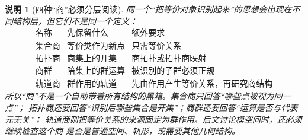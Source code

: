 \documentclass[UTF8,fontset=none,a4paper,11pt]{ctexart}
\theoremstyle{foundation-definition}
\theoremstyle{foundation-theorem}
\theoremstyle{foundation-proposition}
\theoremstyle{foundation-example}
\theoremstyle{foundation-remark}
\newtheorem{remark}[definition]{说明}
\theoremstyle{foundation-theorem}
\begin{document}
\begin{remark}[四种“商”必须分层阅读]\label{rem:quotient-layers}
同一个“把等价对象识别起来”的思想会出现在不同结构层，但它们不是同一个定义：
\[
\begin{array}{c|c|c}
\text{名称}&\text{先保留什么}&\text{额外要求}\\
\hline
\text{集合商}&\text{等价类作为新点}&\text{只需等价关系}\\
\text{拓扑商}&\text{商集上的开集}&\text{商拓扑或拓扑商映射}\\
\text{商群}&\text{陪集上的群运算}&\text{被识别的子群必须正规}\\
\text{轨道商}&\text{群作用的轨道}&\text{先由作用产生等价关系，再研究商结构}
\end{array}
\]
所以“商”不是一个自动带着所有结构的黑箱。集合商只回答“哪些点被视为同一点”；
拓扑商还要回答“识别后哪些集合是开集”；商群还要回答“运算是否与代表元无关”；
轨道商则把等价关系的来源固定为群作用。后文讨论模空间时，还必须继续检查这个商
是否是普通空间、轨形，或需要其他几何结构。
\end{remark}
\end{document}
